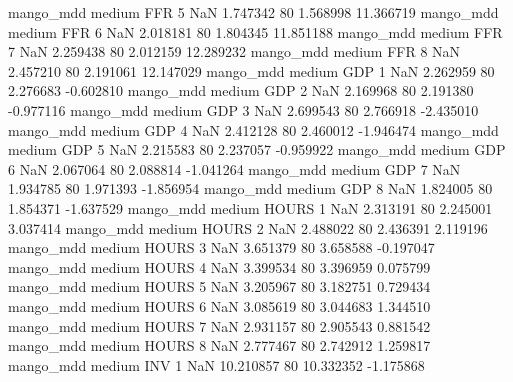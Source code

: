         mango_mdd     medium      FFR                 5                  NaN  1.747342 80       1.568998          11.366719
        mango_mdd     medium      FFR                 6                  NaN  2.018181 80       1.804345          11.851188
        mango_mdd     medium      FFR                 7                  NaN  2.259438 80       2.012159          12.289232
        mango_mdd     medium      FFR                 8                  NaN  2.457210 80       2.191061          12.147029
        mango_mdd     medium      GDP                 1                  NaN  2.262959 80       2.276683          -0.602810
        mango_mdd     medium      GDP                 2                  NaN  2.169968 80       2.191380          -0.977116
        mango_mdd     medium      GDP                 3                  NaN  2.699543 80       2.766918          -2.435010
        mango_mdd     medium      GDP                 4                  NaN  2.412128 80       2.460012          -1.946474
        mango_mdd     medium      GDP                 5                  NaN  2.215583 80       2.237057          -0.959922
        mango_mdd     medium      GDP                 6                  NaN  2.067064 80       2.088814          -1.041264
        mango_mdd     medium      GDP                 7                  NaN  1.934785 80       1.971393          -1.856954
        mango_mdd     medium      GDP                 8                  NaN  1.824005 80       1.854371          -1.637529
        mango_mdd     medium    HOURS                 1                  NaN  2.313191 80       2.245001           3.037414
        mango_mdd     medium    HOURS                 2                  NaN  2.488022 80       2.436391           2.119196
        mango_mdd     medium    HOURS                 3                  NaN  3.651379 80       3.658588          -0.197047
        mango_mdd     medium    HOURS                 4                  NaN  3.399534 80       3.396959           0.075799
        mango_mdd     medium    HOURS                 5                  NaN  3.205967 80       3.182751           0.729434
        mango_mdd     medium    HOURS                 6                  NaN  3.085619 80       3.044683           1.344510
        mango_mdd     medium    HOURS                 7                  NaN  2.931157 80       2.905543           0.881542
        mango_mdd     medium    HOURS                 8                  NaN  2.777467 80       2.742912           1.259817
        mango_mdd     medium      INV                 1                  NaN 10.210857 80      10.332352          -1.175868
